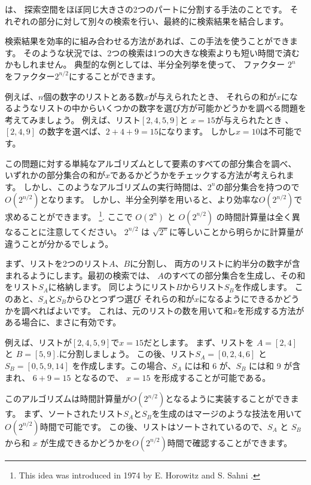 
は、
探索空間をほぼ同じ大きさの2つのパートに分割する手法のことです。
それぞれの部分に対して別々の検索を行い、最終的に検索結果を結合します。

検索結果を効率的に組み合わせる方法があれば、この手法を使うことができます。
そのような状況では、2つの検索は1つの大きな検索よりも短い時間で済むかもしれません。
典型的な例としては、半分全列挙を使って、
ファクター $2^n$ をファクター$2^{n/2}$にすることができます。

例えば、$n$個の数字のリストとある数$x$が与えられたとき、
それらの和が$x$になるようなリストの中からいくつかの数字を選び方が可能かどうかを調べる問題を考えてみましょう。
例えば、リスト$[2,4,5,9]$と $x = 15$が与えられたとき 、
$[2,4,9]$ の数字を選べば、$2+4+9=15$になります。
しかし$x=10$は不可能です。

この問題に対する単純なアルゴリズムとして要素のすべての部分集合を調べ、
いずれかの部分集合の和が$x$であるかどうかをチェックする方法が考えられます。
しかし、このようなアルゴリズムの実行時間は、$2^n$の部分集合を持つので$O(2^{n/2})$となります。
しかし、半分全列挙を用いると、より効率な$O(2^{n/2})$で求めることができます。
\footnote{This
idea was introduced in 1974 by E. Horowitz and S. Sahni \cite{hor74}.}.
ここで $O(2^n)$ と $O(2^{n/2})$ の時間計算量は全く異なることに注意してください。
$2^{n/2}$ は $\sqrt{2^n}$に等しいことから明らかに計算量が違うことが分かるでしょう。

まず、リストを2つのリスト$A$、$B$に分割し、
両方のリストに約半分の数字が含まれるようにします。最初の検索では、
$A$のすべての部分集合を生成し、その和をリスト$S_A$に格納します。
同じようにリスト$B$からリスト$S_B$を作成します。
このあと、$S_A$と$S_B$からひとつずつ選び
それらの和が$x$になるようにできるかどうかを調べればよいです。
これは、元のリストの数を用いて和$x$を形成する方法がある場合に、まさに有効です。

例えば、リストが$[2,4,5,9]$で$x=15$だとします。
まず、リストを $A=[2,4]$ と $B=[5,9]$.に分割しましょう。
この後、リスト$S_A=[0,2,4,6]$ と $S_B=[0,5,9,14]$
を作成します。この場合、$S_A$ には和 $6$ が、$S_B$ には和 9 が含まれ、
$6 + 9 = 15$ となるので、
$x = 15$ を形成することが可能である。

このアルゴリズムは時間計算量が$O(2^{n/2})$となるように実装することができます。
まず、ソートされたリスト$S_A$と$S_B$を生成のはマージのような技法を用いて$O(2^{n/2})$時間で可能です。
この後、リストはソートされているので、$S_A$ と $S_B$ から和 $x$ が生成できるかどうかを$O(2^{n/2})$時間で確認することができます。